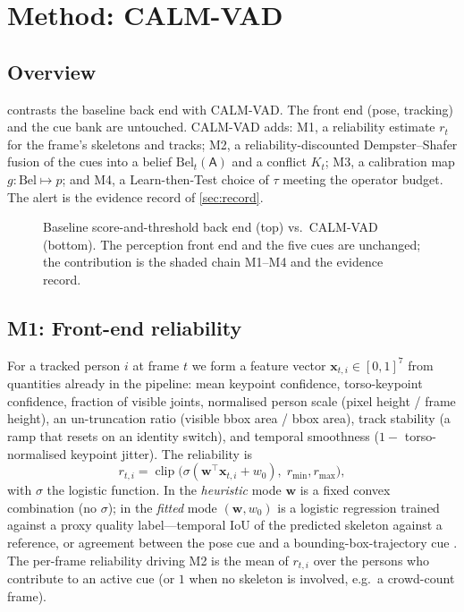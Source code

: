 \documentclass[conference]{IEEEtran}
\newcommand{\Rel}{r}                 %
\newcommand{\bel}{\mathrm{Bel}}
\newcommand{\Anom}{\textsf{A}}       %
\newcommand{\method}{CALM-VAD}
\begin{document}
\section{Method: \method{}}
\label{sec:method}

\subsection{Overview}
 contrasts the baseline back end with \method{}. The front end
(pose, tracking) and the cue bank are untouched. \method{} adds: M1, a
reliability estimate $\Rel_t$ for the frame's skeletons and tracks; M2, a
reliability-discounted Dempster--Shafer fusion of the cues into a belief
$\bel_t(\Anom)$ and a conflict $K_t$; M3, a calibration map
$g:\bel\mapsto p$; and M4, a Learn-then-Test choice of $\tau$ meeting the
operator budget. The alert is the evidence record of
\cref{sec:record}.

\begin{figure}[t]
\centering

\caption{Baseline score-and-threshold back end (top) vs.\ \method{} (bottom).
The perception front end and the five cues are unchanged; the contribution is
the shaded chain M1--M4 and the evidence record.}
\label{fig:arch}
\end{figure}

\subsection{M1: Front-end reliability}
\label{sec:m1}
For a tracked person $i$ at frame $t$ we form a feature vector
$\mathbf{x}_{t,i}\in[0,1]^7$ from quantities already in the pipeline: mean
keypoint confidence, torso-keypoint confidence, fraction of visible joints,
normalised person scale (pixel height / frame height), an un-truncation ratio
(visible bbox area / bbox area), track stability (a ramp that resets on an
identity switch), and temporal smoothness ($1-$ torso-normalised keypoint
jitter). The reliability is
\begin{equation}
\Rel_{t,i}=\operatorname{clip}\!\bigl(\sigma(\mathbf{w}^\top\mathbf{x}_{t,i}+w_0),\;\Rel_{\min},\Rel_{\max}\bigr),
\end{equation}
with $\sigma$ the logistic function. In the \emph{heuristic} mode $\mathbf{w}$
is a fixed convex combination (no $\sigma$); in the \emph{fitted} mode
$(\mathbf{w},w_0)$ is a logistic regression trained against a proxy quality
label---temporal IoU of the predicted skeleton against a reference, or
agreement between the pose cue and a bounding-box-trajectory cue
\cite{bboxtraj2026}. The per-frame reliability driving M2 is the mean of
$\Rel_{t,i}$ over the persons who contribute to an active cue (or $1$ when no
skeleton is involved, e.g.\ a crowd-count frame).
\end{document}
